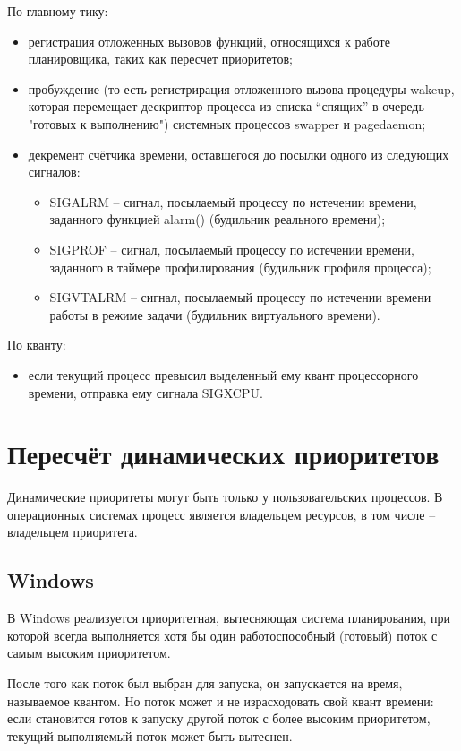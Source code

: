 По главному тику: 
\begin{itemize}
	\item регистрация отложенных вызовов функций, относящихся к работе планировщика,
	таких как пересчет приоритетов;
	\item пробуждение (то есть регистрирация отложенного вызова процедуры wakeup, которая перемещает дескриптор процесса из списка “спящих” в очередь "готовых к выполнению") системных процессов {\ttfamily swapper} и {\ttfamily pagedaemon};
	\item декремент счётчика времени, оставшегося до посылки одного из следующих сигналов:
	\begin{itemize}
		\item {\ttfamily SIGALRM} – сигнал, посылаемый процессу по истечении времени, заданного функцией {\ttfamily alarm()} (будильник реального времени);
		\item {\ttfamily SIGPROF} –  сигнал, посылаемый процессу по истечении времени, заданного в таймере профилирования (будильник профиля процесса);
		\item {\ttfamily SIGVTALRM} –  сигнал, посылаемый процессу по истечении времени работы в режиме задачи (будильник виртуального времени).
	\end{itemize}
\end{itemize}

По кванту:
\begin{itemize}
	\item если текущий процесс превысил выделенный ему квант процессорного времени, отправка ему сигнала SIGXCPU.
\end{itemize}


\chapter{Пересчёт динамических приоритетов}

Динамические приоритеты могут быть только у пользовательских процессов. В операционных системах процесс является владельцем ресурсов, в том числе -- владельцем приоритета.


\section{Windows}
В Windows реализуется приоритетная, вытесняющая система планирования, при  которой всегда выполняется хотя бы один работоспособный (готовый) поток с самым высоким приоритетом. 

После того как поток был выбран для запуска, он запускается на время, называемое квантом. Но поток может и не израсходовать свой квант времени: если становится готов к запуску другой поток с более высоким приоритетом, текущий выполняемый поток может быть вытеснен.

